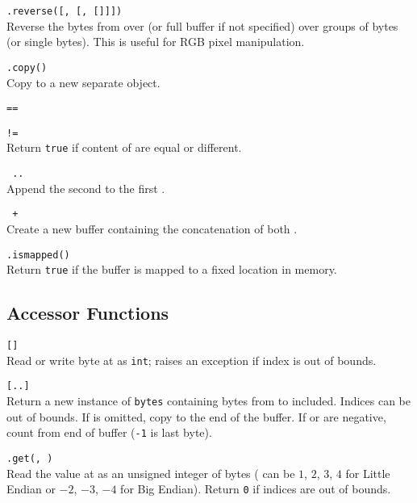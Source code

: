 \hangpar {}\texttt{.reverse([}\texttt{, [}\texttt{, [}\texttt{]]])}\\
Reverse the bytes from  over  (or full buffer if not specified) over groups of  bytes (or single bytes). This is useful for RGB pixel manipulation.

\hangpar {}\texttt{.copy()}\\
Copy to a new separate object.

\hangpar {}\texttt{==}

\hangpar {}\texttt{!=}\\
Return \texttt{true} if content of  are equal or different.

\hangpar {}\texttt{ .. }\\
Append the second  to the first .

\hangpar {}\texttt{ + }\\
Create a new  buffer containing the concatenation of both .

\hangpar {}\texttt{.ismapped()}\\
Return \texttt{true} if the buffer is mapped to a fixed location in memory.

\subsection*{Accessor Functions}

\hangpar {}\texttt{[}\texttt{]} \\
Read or write byte at  as \texttt{int}; raises an exception if index is out of bounds.

\hangpar {}\texttt{[}\texttt{..}\texttt{]} \\
Return a new instance of \texttt{bytes} containing bytes from  to  included. Indices can be out of bounds. If  is omitted, copy to the end of the buffer. If  or  are negative, count from end of buffer (\texttt{-1} is last byte).

\hangpar {}\texttt{.get(}\texttt{, }\texttt{)} \\
Read the value at  as an unsigned integer of  bytes ( can be $1$, $2$, $3$, $4$ for Little Endian or $-2$, $-3$, $-4$ for Big Endian). Return \texttt{0} if indices are out of bounds.

